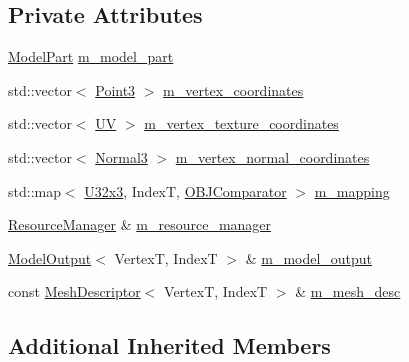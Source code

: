\subsection*{Private Attributes}
\begin{DoxyCompactItemize}
\item 
\mbox{\hyperlink{structmage_1_1rendering_1_1_model_part}{Model\+Part}} \mbox{\hyperlink{classmage_1_1rendering_1_1loader_1_1_o_b_j_reader_a964d90188a9ced3003b5aa3a9b82602b}{m\+\_\+model\+\_\+part}}
\item 
std\+::vector$<$ \mbox{\hyperlink{structmage_1_1_point3}{Point3}} $>$ \mbox{\hyperlink{classmage_1_1rendering_1_1loader_1_1_o_b_j_reader_a393e0932f169a786e38f120fc6f0d84b}{m\+\_\+vertex\+\_\+coordinates}}
\item 
std\+::vector$<$ \mbox{\hyperlink{structmage_1_1_u_v}{UV}} $>$ \mbox{\hyperlink{classmage_1_1rendering_1_1loader_1_1_o_b_j_reader_aed919290e638cbe00a9144fdcb652178}{m\+\_\+vertex\+\_\+texture\+\_\+coordinates}}
\item 
std\+::vector$<$ \mbox{\hyperlink{structmage_1_1_normal3}{Normal3}} $>$ \mbox{\hyperlink{classmage_1_1rendering_1_1loader_1_1_o_b_j_reader_ac977ade8154bef446524526e8297f3eb}{m\+\_\+vertex\+\_\+normal\+\_\+coordinates}}
\item 
std\+::map$<$ \mbox{\hyperlink{namespacemage_a1e9348414b777b1a460dc4f295bc87fc}{U32x3}}, IndexT, \mbox{\hyperlink{structmage_1_1rendering_1_1loader_1_1_o_b_j_reader_1_1_o_b_j_comparator}{O\+B\+J\+Comparator}} $>$ \mbox{\hyperlink{classmage_1_1rendering_1_1loader_1_1_o_b_j_reader_a4bad8aafabddb5cec68be8357d2d7566}{m\+\_\+mapping}}
\item 
\mbox{\hyperlink{classmage_1_1rendering_1_1_resource_manager}{Resource\+Manager}} \& \mbox{\hyperlink{classmage_1_1rendering_1_1loader_1_1_o_b_j_reader_ae6208964e05f3e93eb9939942fe3b55c}{m\+\_\+resource\+\_\+manager}}
\item 
\mbox{\hyperlink{structmage_1_1rendering_1_1_model_output}{Model\+Output}}$<$ VertexT, IndexT $>$ \& \mbox{\hyperlink{classmage_1_1rendering_1_1loader_1_1_o_b_j_reader_a645fca7c3f7f9860cb879f4088c4f8fc}{m\+\_\+model\+\_\+output}}
\item 
const \mbox{\hyperlink{classmage_1_1rendering_1_1_mesh_descriptor}{Mesh\+Descriptor}}$<$ VertexT, IndexT $>$ \& \mbox{\hyperlink{classmage_1_1rendering_1_1loader_1_1_o_b_j_reader_aa029c035456ea9456d63726b15e5db05}{m\+\_\+mesh\+\_\+desc}}
\end{DoxyCompactItemize}
\subsection*{Additional Inherited Members}



